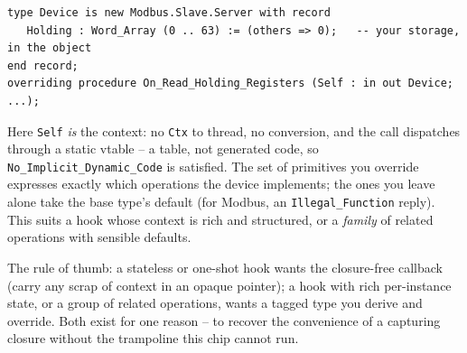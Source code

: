 \begin{lstlisting}
type Device is new Modbus.Slave.Server with record
   Holding : Word_Array (0 .. 63) := (others => 0);   -- your storage, in the object
end record;
overriding procedure On_Read_Holding_Registers (Self : in out Device; ...);
\end{lstlisting}

Here \texttt{Self} \emph{is} the context: no \texttt{Ctx} to thread, no conversion,
and the call dispatches through a static vtable -- a table, not generated code, so
\texttt{No\_Implicit\_Dynamic\_Code} is satisfied. The set of primitives you
override expresses exactly which operations the device implements; the ones you
leave alone take the base type's default (for Modbus, an \texttt{Illegal\_Function}
reply). This suits a hook whose context is rich and structured, or a \emph{family}
of related operations with sensible defaults.

The rule of thumb: a stateless or one-shot hook wants the closure-free callback
(carry any scrap of context in an opaque pointer); a hook with rich per-instance
state, or a group of related operations, wants a tagged type you derive and
override. Both exist for one reason -- to recover the convenience of a capturing
closure without the trampoline this chip cannot run.
